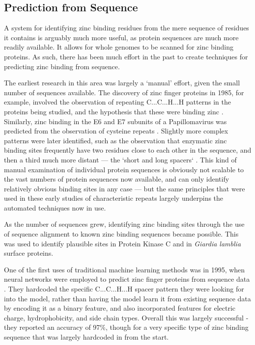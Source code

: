 \subsection{Prediction from Sequence}

A system for identifying zinc binding residues from the mere sequence of residues it contains is arguably much more useful, as protein sequences are much more readily available. It allows for whole genomes to be scanned for zinc binding proteins. As such, there has been much effort in the past to create techniques for predicting zinc binding from sequence.

The earliest research in this area was largely a `manual' effort, given the small number of sequences available. The discovery of zinc finger proteins in 1985, for example, involved the observation of repeating C...C...H...H patterns in the proteins being studied, and the hypothesis that these were binding zinc \cite{miller1985repetitive}. Similarly, zinc binding in the E6 and E7 subunits of a Papillomavirus was predicted from the observation of cysteine repeats \cite{barbosa1989papillomavirus}. Slightly more complex patterns were later identified, such as the observation that enzymatic zinc binding sites frequently have two residues close to each other in the sequence, and then a third much more distant --- the `short and long spacers` \cite{vallee1989short}. This kind of manual examination of individual protein sequences is obviously not scalable to the vast numbers of protein sequences now available, and can only identify relatively obvious binding sites in any case --- but the same principles that were used in these early studies of characteristic repeats largely underpins the automated techniques now in use.

As the number of sequences grew, identifying zinc binding sites through the use of sequence alignment to known zinc binding sequences became possible. This was used to identify plausible sites in Protein Kinase C \cite{bishop1991identification} and in {\it Giardia lamblia} surface proteins.

One of the first uses of traditional machine learning methods was in 1995, when neural networks were employed to predict zinc finger proteins from sequence data \cite{nakata1995prediction}. They hardcoded the specific C...C...H...H spacer pattern they were looking for into the model, rather than having the model learn it from existing sequence data by encoding it as a binary feature, and also incorporated features for electric charge, hydrophobicity, and side chain types. Overall this was largely successful - they reported an accuracy of 97\%, though for a very specific type of zinc binding sequence that was largely hardcoded in from the start.

